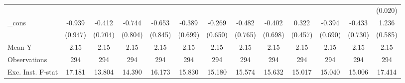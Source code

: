 {\begin{tabular}{l*{12}{c}}
            &                     &                     &                     &                     &                     &                     &                     &                     &                     &                     &                     &     (0.020)         \\
\addlinespace
\_cons      &      -0.939         &      -0.412         &      -0.744         &      -0.653         &      -0.389         &      -0.269         &      -0.482         &      -0.402         &       0.322         &      -0.394         &      -0.433         &       1.236\sym{*}  \\
            &     (0.947)         &     (0.704)         &     (0.804)         &     (0.845)         &     (0.699)         &     (0.650)         &     (0.765)         &     (0.698)         &     (0.457)         &     (0.690)         &     (0.730)         &     (0.585)         \\
\midrule
Mean Y      &        2.15         &        2.15         &        2.15         &        2.15         &        2.15         &        2.15         &        2.15         &        2.15         &        2.15         &        2.15         &        2.15         &        2.15         \\
Observations&         294         &         294         &         294         &         294         &         294         &         294         &         294         &         294         &         294         &         294         &         294         &         294         \\
Exc. Inst. F-stat&      17.181         &      13.804         &      14.390         &      16.173         &      15.830         &      15.180         &      15.574         &      15.632         &      15.017         &      15.040         &      15.006         &      17.414         \\
\bottomrule
\end{tabular}
}
